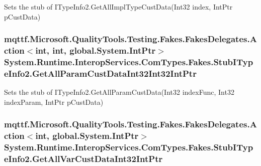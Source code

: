 Sets the stub of I\-Type\-Info2.\-Get\-All\-Impl\-Type\-Cust\-Data(\-Int32 index, Int\-Ptr p\-Cust\-Data)

\hypertarget{class_system_1_1_runtime_1_1_interop_services_1_1_com_types_1_1_fakes_1_1_stub_i_type_info2_aa746386964db4bf9f9cac0c931bf7544}{
\subsubsection[{Get\-All\-Param\-Cust\-Data\-Int32\-Int32\-Int\-Ptr}]{\setlength{\rightskip}{0pt plus 5cm}mqttf.\-Microsoft.\-Quality\-Tools.\-Testing.\-Fakes.\-Fakes\-Delegates.\-Action$<$int, int, global.\-System.\-Int\-Ptr$>$ System.\-Runtime.\-Interop\-Services.\-Com\-Types.\-Fakes.\-Stub\-I\-Type\-Info2.\-Get\-All\-Param\-Cust\-Data\-Int32\-Int32\-Int\-Ptr}}\label{class_system_1_1_runtime_1_1_interop_services_1_1_com_types_1_1_fakes_1_1_stub_i_type_info2_aa746386964db4bf9f9cac0c931bf7544}


Sets the stub of I\-Type\-Info2.\-Get\-All\-Param\-Cust\-Data(\-Int32 index\-Func, Int32 index\-Param, Int\-Ptr p\-Cust\-Data)

\hypertarget{class_system_1_1_runtime_1_1_interop_services_1_1_com_types_1_1_fakes_1_1_stub_i_type_info2_a0189884bc741eb683a7a5d1e3831a754}{
\subsubsection[{Get\-All\-Var\-Cust\-Data\-Int32\-Int\-Ptr}]{\setlength{\rightskip}{0pt plus 5cm}mqttf.\-Microsoft.\-Quality\-Tools.\-Testing.\-Fakes.\-Fakes\-Delegates.\-Action$<$int, global.\-System.\-Int\-Ptr$>$ System.\-Runtime.\-Interop\-Services.\-Com\-Types.\-Fakes.\-Stub\-I\-Type\-Info2.\-Get\-All\-Var\-Cust\-Data\-Int32\-Int\-Ptr}}\label{class_system_1_1_runtime_1_1_interop_services_1_1_com_types_1_1_fakes_1_1_stub_i_type_info2_a0189884bc741eb683a7a5d1e3831a754}



